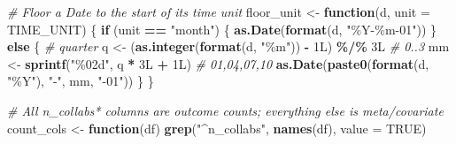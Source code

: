 \documentclass[
]{article}
\newenvironment{Shaded}{\begin{snugshade}}{\end{snugshade}}
\newcommand{\AttributeTok}[1]{\textcolor[rgb]{0.13,0.29,0.53}{#1}}
\newcommand{\CommentTok}[1]{\textcolor[rgb]{0.56,0.35,0.01}{\textit{#1}}}
\newcommand{\ConstantTok}[1]{\textcolor[rgb]{0.56,0.35,0.01}{#1}}
\newcommand{\ControlFlowTok}[1]{\textcolor[rgb]{0.13,0.29,0.53}{\textbf{#1}}}
\newcommand{\DataTypeTok}[1]{\textcolor[rgb]{0.13,0.29,0.53}{#1}}
\newcommand{\DecValTok}[1]{\textcolor[rgb]{0.00,0.00,0.81}{#1}}
\newcommand{\FunctionTok}[1]{\textcolor[rgb]{0.13,0.29,0.53}{\textbf{#1}}}
\newcommand{\NormalTok}[1]{#1}
\newcommand{\OtherTok}[1]{\textcolor[rgb]{0.56,0.35,0.01}{#1}}
\newcommand{\SpecialCharTok}[1]{\textcolor[rgb]{0.81,0.36,0.00}{\textbf{#1}}}
\newcommand{\StringTok}[1]{\textcolor[rgb]{0.31,0.60,0.02}{#1}}
\begin{document}
\begin{Shaded}
\begin{Highlighting}[]
\CommentTok{\# Floor a Date to the start of its time unit}
\NormalTok{floor\_unit }\OtherTok{\textless{}{-}} \ControlFlowTok{function}\NormalTok{(d, }\AttributeTok{unit =}\NormalTok{ TIME\_UNIT) \{}
  \ControlFlowTok{if}\NormalTok{ (unit }\SpecialCharTok{==} \StringTok{"month"}\NormalTok{) \{}
    \FunctionTok{as.Date}\NormalTok{(}\FunctionTok{format}\NormalTok{(d, }\StringTok{"\%Y{-}\%m{-}01"}\NormalTok{))}
\NormalTok{  \} }\ControlFlowTok{else}\NormalTok{ \{  }\CommentTok{\# quarter}
\NormalTok{    q  }\OtherTok{\textless{}{-}}\NormalTok{ (}\FunctionTok{as.integer}\NormalTok{(}\FunctionTok{format}\NormalTok{(d, }\StringTok{"\%m"}\NormalTok{)) }\SpecialCharTok{{-}} \DecValTok{1}\DataTypeTok{L}\NormalTok{) }\SpecialCharTok{\%/\%} \DecValTok{3}\DataTypeTok{L}          \CommentTok{\# 0..3}
\NormalTok{    mm }\OtherTok{\textless{}{-}} \FunctionTok{sprintf}\NormalTok{(}\StringTok{"\%02d"}\NormalTok{, q }\SpecialCharTok{*} \DecValTok{3}\DataTypeTok{L} \SpecialCharTok{+} \DecValTok{1}\DataTypeTok{L}\NormalTok{)                       }\CommentTok{\# 01,04,07,10}
    \FunctionTok{as.Date}\NormalTok{(}\FunctionTok{paste0}\NormalTok{(}\FunctionTok{format}\NormalTok{(d, }\StringTok{"\%Y"}\NormalTok{), }\StringTok{"{-}"}\NormalTok{, mm, }\StringTok{"{-}01"}\NormalTok{))}
\NormalTok{  \}}
\NormalTok{\}}

\CommentTok{\# All n\_collabs* columns are outcome counts; everything else is meta/covariate}
\NormalTok{count\_cols }\OtherTok{\textless{}{-}} \ControlFlowTok{function}\NormalTok{(df) }\FunctionTok{grep}\NormalTok{(}\StringTok{"\^{}n\_collabs"}\NormalTok{, }\FunctionTok{names}\NormalTok{(df), }\AttributeTok{value =} \ConstantTok{TRUE}\NormalTok{)}
\end{Highlighting}
\end{Shaded}
\end{document}
